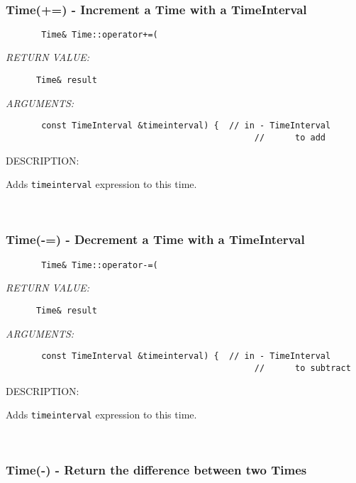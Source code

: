 \mbox{}\hrulefill\ 
 
\subsubsection [Time(+=)] {Time(+=) - Increment a Time with a TimeInterval}


  
\begin{verbatim}       Time& Time::operator+=(\end{verbatim}{\em RETURN VALUE:}
\begin{verbatim}      Time& result\end{verbatim}{\em ARGUMENTS:}
\begin{verbatim}       const TimeInterval &timeinterval) {  // in - TimeInterval
                                                 //      to add\end{verbatim}
{\sf DESCRIPTION:\\ }


      Adds {\tt timeinterval} expression to this time.
   
 
\mbox{}\hrulefill\ 
 
\subsubsection [Time(-=)] {Time(-=) - Decrement a Time with a TimeInterval}


  
\begin{verbatim}       Time& Time::operator-=(\end{verbatim}{\em RETURN VALUE:}
\begin{verbatim}      Time& result\end{verbatim}{\em ARGUMENTS:}
\begin{verbatim}       const TimeInterval &timeinterval) {  // in - TimeInterval
                                                 //      to subtract\end{verbatim}
{\sf DESCRIPTION:\\ }


      Adds {\tt timeinterval} expression to this time.
   
 
\mbox{}\hrulefill\ 
 
\subsubsection [Time(-)] {Time(-) - Return the difference between two Times}


